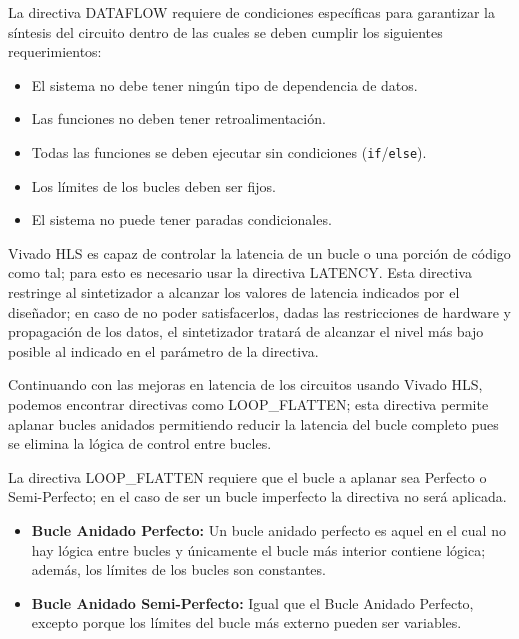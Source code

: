 La directiva DATAFLOW requiere de condiciones específicas para garantizar la síntesis del circuito dentro de las cuales se deben cumplir los siguientes requerimientos:

\begin{itemize}
\item El sistema no debe tener ningún tipo de dependencia de datos.
\item Las funciones no deben tener retroalimentación.
\item Todas las funciones se deben ejecutar sin condiciones (\texttt{if}/\texttt{else}).
\item Los límites de los bucles deben ser fijos.
\item El sistema no puede tener paradas condicionales.
\end{itemize}

Vivado HLS es capaz de controlar la latencia de un bucle o una porción de código como tal; para esto es necesario usar la directiva LATENCY. Esta directiva restringe al sintetizador a alcanzar los valores de latencia indicados por el diseñador; en caso de no poder satisfacerlos, dadas las restricciones de hardware y propagación de los datos, el sintetizador tratará de alcanzar el nivel más bajo posible al indicado en el parámetro de la directiva.

Continuando con las mejoras en latencia de los circuitos usando Vivado HLS, podemos encontrar directivas como LOOP\_FLATTEN; esta directiva permite aplanar bucles anidados permitiendo reducir la latencia del bucle completo pues se elimina la lógica de control entre bucles.

La directiva LOOP\_FLATTEN requiere que el bucle a aplanar sea Perfecto o Semi-Perfecto; en el caso de ser un bucle imperfecto la directiva no será aplicada.

\begin{itemize}

\item \textbf{Bucle Anidado Perfecto:} Un bucle anidado perfecto es aquel en el cual no hay lógica entre bucles y únicamente el bucle más interior contiene lógica; además, los límites de los bucles son constantes.

\item \textbf{Bucle Anidado Semi-Perfecto:} Igual que el Bucle Anidado Perfecto, excepto porque los límites del bucle más externo pueden ser variables.

\end{itemize}

